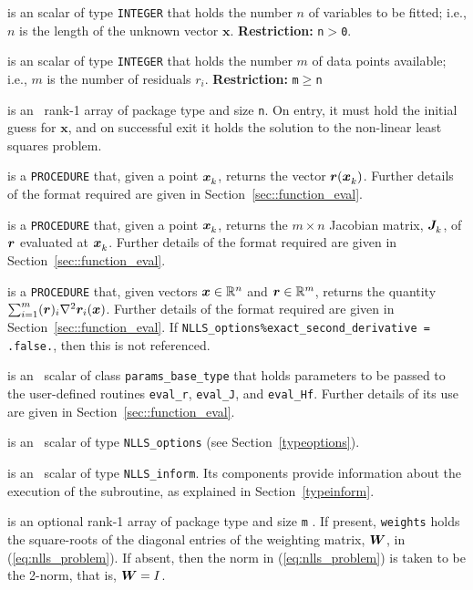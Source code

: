 \documentclass{spec}
\newcommand{\scalarintegerii}{is an \intentin scalar of type {\tt INTEGER} }
\newcommand{\ronearrayrealiiopt}[1]{is an optional \intentin rank-1 array of package type and size {\tt #1} }
\begin{document}
\begin{description}
 \scalarintegerii that holds the number $n$ of
variables to be fitted; i.e., $n$ is the length of the unknown vector $\bm x$. 
\textbf{Restriction:} \texttt{n}$>${\tt 0}.

 \scalarintegerii that holds the number $m$ of
data points available; i.e., $m$ is the number of residuals $r_i$.
\textbf{Restriction:} \texttt{m}$\geq$\texttt{n}

 is an \intentinout\  rank-1 array of package type
and size {\tt n}.  On entry, it must hold the initial guess for $\bm x$, and on
successful exit it holds the solution to the non-linear least squares problem.

 is a {\tt PROCEDURE} that, given a point ${\bm x}_{k}^{}$, returns the vector ${\bm r}({\bm x}_{k}^{})$.
Further details of the format required are given in Section~\ref{sec::function_eval}.

 is a {\tt PROCEDURE} that, given a point ${\bm x}_{k}^{}$,
returns the $m \times n$ Jacobian matrix, ${\bm J}_{k}^{}$, of ${\bm r}$ evaluated at ${\bm x}_{k}^{}$.
Further details of the format required are given in Section~\ref{sec::function_eval}.

 is a {\tt PROCEDURE} that, given vectors ${\bm x} \in \mathbb{R}^n$
and ${\bm r} \in \mathbb{R}^m$, returns the quantity $\sum_{i=1}^m ({\bm r})_i \nabla^2 {\bm r}_i ({\bm x})$.
Further details of the format required are given in Section~\ref{sec::function_eval}.  If {\tt NLLS\_options\%exact\_second\_derivative = .false.}, then this is not referenced.

 is an \intentin\ scalar of class {\tt params\_base\_type} that holds parameters to
be passed to the user-defined routines {\tt eval\_r}, {\tt eval\_J}, and {\tt eval\_Hf}.
Further details of its use are given in Section~\ref{sec::function_eval}.

is an \intentin\  scalar  of type {\tt NLLS\_options}
(see Section~\ref{typeoptions}).

 is an \intentinout\ scalar of type
{\tt NLLS\_inform}. Its components provide information about the execution
of the subroutine, as explained in Section~\ref{typeinform}.

 \ronearrayrealiiopt{m}.  If present, {\tt weights} holds the square-roots of the 
diagonal entries of the weighting matrix, ${\bm W}$, in (\ref{eq:nlls_problem}).  If absent, then the norm in (\ref{eq:nlls_problem}) is taken to be the 2-norm, that is, ${\bm W} = I$.

\end{description}
\end{document}
